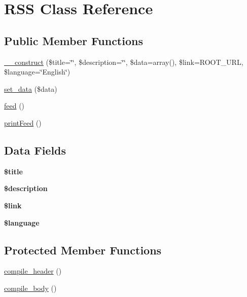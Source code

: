 \hypertarget{class_r_s_s}{
\section{RSS Class Reference}
\label{class_r_s_s}
}
\subsection*{Public Member Functions}
\begin{DoxyCompactItemize}
\item 
\hyperlink{class_r_s_s_aed4b1eae06bbde7650390405ef11f5ed}{\_\-\_\-construct} (\$title=\char`\"{}\char`\"{}, \$description=\char`\"{}\char`\"{}, \$data=array(), \$link=ROOT\_\-URL, \$language=\char`\"{}English\char`\"{})
\item 
\hyperlink{class_r_s_s_ac896dcdd1535057e14cd62090a252f8f}{set\_\-data} (\$data)
\item 
\hyperlink{class_r_s_s_acb667570ad18e3b7df8c0861b9c35d94}{feed} ()
\item 
\hyperlink{class_r_s_s_a6ba09ec98507e4387ed20cc5963d85ca}{printFeed} ()
\end{DoxyCompactItemize}
\subsection*{Data Fields}
\begin{DoxyCompactItemize}
\item 
\hypertarget{class_r_s_s_ada57e7bb7c152edad18fe2f166188691}{
{\bfseries \$title}}
\label{class_r_s_s_ada57e7bb7c152edad18fe2f166188691}

\item 
\hypertarget{class_r_s_s_a87b032cba06009e3467abf1c8018d960}{
{\bfseries \$description}}
\label{class_r_s_s_a87b032cba06009e3467abf1c8018d960}

\item 
\hypertarget{class_r_s_s_a5d346e31b75d916e3bac9cb193bfc97f}{
{\bfseries \$link}}
\label{class_r_s_s_a5d346e31b75d916e3bac9cb193bfc97f}

\item 
\hypertarget{class_r_s_s_a83170d318260a5a2e2a79dccdd371b10}{
{\bfseries \$language}}
\label{class_r_s_s_a83170d318260a5a2e2a79dccdd371b10}

\end{DoxyCompactItemize}
\subsection*{Protected Member Functions}
\begin{DoxyCompactItemize}
\item 
\hyperlink{class_r_s_s_aeccc0328f6103e3390d40a7d34d74d5b}{compile\_\-header} ()
\item 
\hyperlink{class_r_s_s_ab0fca9596ff06cb879eff31b88a656bb}{compile\_\-body} ()
\end{DoxyCompactItemize}
